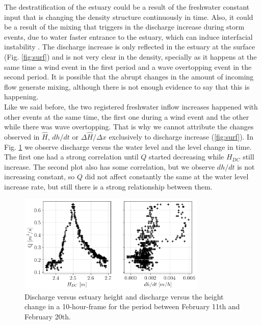 \documentclass[tesis.tex]{subfiles}
\begin{document}
The destratification of the estuary could be a result of the freshwater constant input that is changing the density structure continuously in time. Also, it could be a result of the mixing that triggers in the discharge increase during storm events, due to water faster entrance to the estuary, which can induce interfacial instability \citep{Katopodes2018}. The discharge increase is only reflected in the estuary at the surface (Fig. \ref{fig:surf}) and is not very clear in the density, specially as it happens at the same time a wind event in the first period and a wave overtopping event in the second period. It is possible that the abrupt changes in the amount of incoming flow generate mixing, although there is not enough evidence to say that this is happening.\\

Like we said before, the two registered freshwater inflow increases happened with other events at the same time, the first one during a wind event and the other while there was wave overtopping. That is why we cannot attribute the changes observed in $\hat{H}$, $dh/dt$ or $\Delta \hat{H}/\Delta x$ exclusively to discharge increase (\ref{fig:surf}). In Fig. \ref{fig:qh} we observe discharge versus the water level and the level change in time. The first one had a strong correlation until $Q$ started decreasing while $H_{DC}$ still increase. The second plot also has some correlation, but we observe $dh/dt$ is not increasing constant, so $Q$ did not affect constantly the same at the water level increase rate, but still there is a strong relationship between them.\\

\begin{figure}[h!]
    \centering
    \includegraphics[width=0.8\textwidth]{Imagenes/qh.png}
    \caption{Discharge versus estuary height and discharge versus the height change in a 10-hour-frame for the period between February 11th and February 20th.}
    \label{fig:qh}
\end{figure}
\end{document}

